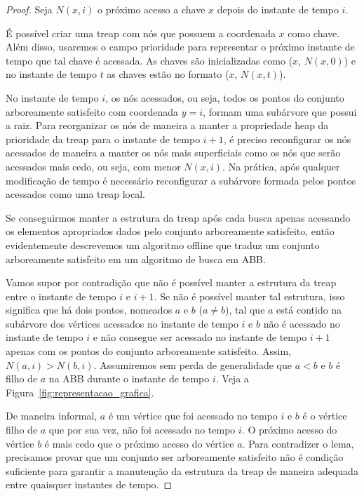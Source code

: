 \begin{proof}

Seja $N(x,i)$ o próximo acesso a chave $x$ depois do instante de tempo $i$.

É possível criar uma treap com nós que possuem a coordenada $x$ como chave. Além disso, usaremos o campo prioridade para representar o próximo instante de tempo que tal chave é acessada. As chaves são inicializadas como ($x$, $N(x,0)$) e no instante de tempo $t$ as chaves estão no formato ($x$, $N(x,t)$).

No instante de tempo $i$, os nós acessados, ou seja, todos os pontos do conjunto arboreamente satisfeito com coordenada $y=i$, formam uma subárvore que possui a raiz. Para reorganizar os nós de maneira a manter a propriedade heap da prioridade da treap para o instante de tempo $i+1$, é preciso reconfigurar os nós acessados de maneira a manter os nós mais superficiais como os nós que serão acessados mais cedo, ou seja, com menor $N(x,i)$. Na prática, após qualquer modificação de tempo é necessário reconfigurar a subárvore formada pelos pontos acessados como uma treap local.

Se conseguirmos manter a estrutura da treap após cada busca apenas acessando os elementos apropriados dados pelo conjunto arboreamente satisfeito, então evidentemente descrevemos um algoritmo offline que traduz um conjunto arboreamente satisfeito em um algoritmo de busca em ABB.

Vamos supor por contradição que não é possível manter a estrutura da treap entre o instante de tempo $i$ e $i+1$. Se não é possível manter tal estrutura, isso significa que há dois pontos, nomeados $a$ e $b$ ($a \neq b$), tal que $a$ está contido na subárvore dos vértices acessados no instante de tempo $i$ e $b$ não é acessado no instante de tempo $i$ e não consegue ser acessado no instante de tempo $i+1$ apenas com os pontos do conjunto arboreamente satisfeito. Assim, $N(a,i) > N(b,i)$. Assumiremos sem perda de generalidade que $a < b$ e $b$ é filho de $a$ na ABB durante o instante de tempo $i$. Veja a Figura~\ref{fig:representacao_grafica}.

De maneira informal, $a$ é um vértice que foi acessado no tempo $i$ e $b$ é o vértice filho de $a$ que por sua vez, não foi acessado no tempo $i$. O próximo acesso do vértice $b$ é mais cedo que o próximo acesso do vértice $a$. Para contradizer o lema, precisamos provar que um conjunto ser arboreamente satisfeito não é condição suficiente para garantir a manutenção da estrutura da treap de maneira adequada entre quaisquer instantes de tempo.


\end{proof}
